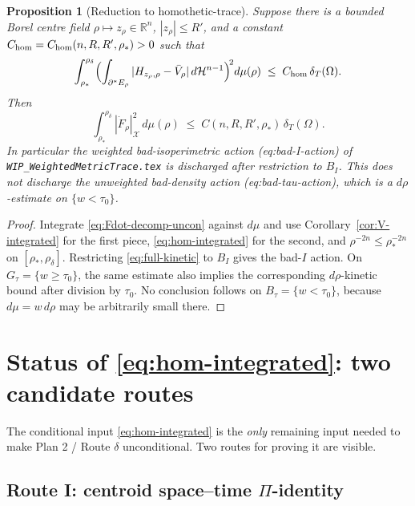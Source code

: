 \documentclass[11pt]{article}
\newtheorem{proposition}[theorem]{Proposition}
\theoremstyle{definition}
\newcommand{\R}{\mathbb{R}}
\newcommand{\Om}{\Omega}
\newcommand{\rstar}{\rho_{*}}
\newcommand{\rdel}{\rho_\delta}
\newcommand{\Hn}{\mathcal H^{n-1}}
\newcommand{\X}{\mathcal X}
\begin{document}
\begin{proposition}[Reduction to homothetic-trace]\label{prop:reduction}
Suppose there is a bounded Borel centre field
$\rho\mapsto z_\rho\in\R^{n}$, $|z_\rho|\le R'$, and a constant
$C_{\rm hom}=C_{\rm hom}(n,R,R',\rstar)>0$ such that
\begin{equation}\label{eq:hom-integrated}
   \int_{\rstar}^{\rdel}\Bigl(\int_{\partial^{*}E_\rho}|H_{z_\rho,\rho}-\bar V_\rho|\,d\Hn\Bigr)^{\!2}d\mu(\rho)
   \;\le\;C_{\rm hom}\,\delta_T(\Om).
\end{equation}
Then
\begin{equation}\label{eq:full-kinetic}
   \int_{\rstar}^{\rdel}|\dot F_\rho|_\X^{2}\,d\mu(\rho)
   \;\le\;C(n,R,R',\rstar)\,\delta_T(\Om).
\end{equation}
In particular the weighted bad-isoperimetric action
\textup{(eq:bad-I-action)} of \texttt{WIP\_WeightedMetricTrace.tex}
is discharged after restriction to \(B_I\).  This does \emph{not}
discharge the unweighted bad-density action
\textup{(eq:bad-tau-action)}, which is a \(d\rho\)-estimate on
\(\{w<\tau_0\}\).
\end{proposition}

\begin{proof}
Integrate \eqref{eq:Fdot-decomp-uncon} against $d\mu$ and use
Corollary~\ref{cor:V-integrated} for the first piece,
\eqref{eq:hom-integrated} for the second, and
$\rho^{-2n}\le\rstar^{-2n}$ on $[\rstar,\rdel]$.
Restricting \eqref{eq:full-kinetic} to \(B_I\) gives the bad-\(I\)
action.  On \(G_\tau=\{w\ge\tau_0\}\), the same estimate also implies
the corresponding \(d\rho\)-kinetic bound after division by
\(\tau_0\).  No conclusion follows on \(B_\tau=\{w<\tau_0\}\), because
\(d\mu=w\,d\rho\) may be arbitrarily small there.
\end{proof}

\section{Status of \eqref{eq:hom-integrated}: two candidate routes}
\label{sec:routes}

The conditional input \eqref{eq:hom-integrated} is the
\emph{only} remaining input needed to make Plan 2 / Route $\delta$
unconditional.  Two routes for proving it are visible.

\subsection{Route I: centroid space--time $\Pi$-identity}
\end{document}

